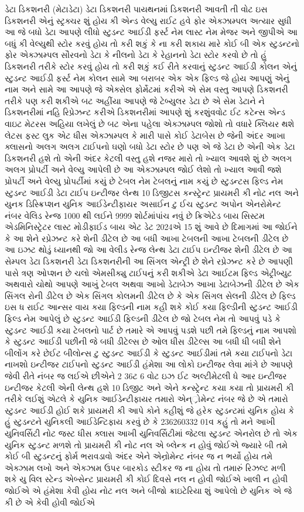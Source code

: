 \documentclass[aspectratio=169, 10pt]{beamer}
\begin{document}
\begin{frame}{ડેટા ડિકશનરી (મેટાડેટા)}
{ડેટા ડિકશનરી પાયથનમાં ડિકશનરી આવતી તી વોટ ઇસ ડિકશનરી એનું સ્ટ્રક્ચર શું હોય કી એન્ડ વેલ્યુ રાઈટ હવે ફોર એક્ઝામ્પલ અત્યાર સુધી આ જે બધો ડેટા આપણે લીધો સ્ટુડન્ટ આઈડી ફર્સ્ટ નેમ લાસ્ટ નેમ મેજર અને જીપીએ આ બધું કી વેલ્યુથી સ્ટોર કરવું હોય તો કરી શકું કે ના કરી શકાય મારે કોઈ બી એક સ્ટુડન્ટનો ફોર એક્ઝામ્પલ સૌરવનો ડેટા કે નીલનો ડેટા કે રેહાનનો ડેટા સ્ટોર કરવો છે તો હું ડિકશનરી તરીકે સ્ટોર કરવું હોય તો કરી શકું કઈ રીતે કરવાનું સ્ટુડન્ટ આઈડી કોલન એનું સ્ટુડન્ટ આઈડી ફર્સ્ટ નેમ કોલન સામે આ બરાબર એક એક ફિલ્ડ જે હોય આપણું એનું નામ અને સામે આ આપણે જે એક્સેલ ફોર્મેટમાં કરીએ એ સેમ વસ્તુ આપણે ડિકશનરી તરીકે પણ કરી શકીએ બટ અહીંયા આપણે જે ટેબ્યુલર ડેટા છે એ સેમ ડેટાને ને ડિકશનરીમાં નહિ રિપ્રેઝન્ટ કરીએ ડિકશનરીમાં આપણે શું કરશુંવવોટ ઈટ કટેન્સ એન્ડ વાઇટ મેટરસ અહિયા લખેલું છે બટ એના પહેલા એક્ઝામ્પલ જોશો તો વધારે ક્લિયર થશે લેટસ ફસ્ટ લુક એટ ધીસ એક્ઝામ્પલ કે મારી પાસે કોઈ ડેટાબેસ છે જેની અંદર આખા ક્લાસનો અલગ અલગ ટાઈપનો ઘણો બધો ડેટા સ્ટોર છે પણ એ જે ડેટા છે એની એક ડેટા ડિકશનરી હશે તો એની અંદર કેટલી વસ્તુ હશે નજર મારો તો ખ્યાલ આવશે શું છે અલગ અલગ પ્રોપર્ટી અને વેલ્યુ આપેલી છે આ એક્ઝામ્પલ જોઈ લેશો તો ખ્યાલ આવી જશે પ્રોપર્ટી અને વેલ્યુ પ્રોપર્ટીમાં કયું છે ટેબલ નેમ ટેબલનું નામ કયું છે સ્ટુડન્ટસ ફિલ્ડ નેમ સ્ટુડન્ટ આઈડી ડેટા ટાઈપ ઇન્ટીજર લેન્થ 10 ડિજીટસ કન્સ્ટ્રેન્ટ પ્રાયમરી કી નોટ નલ અને યુનક ડિસ્ક્રિપ્શન યુનિક આઈડેન્ટીફાયર અસાઈન ટુ ઈચ સ્ટુડન્ટ અપોન એનરોમેન્ટ નંબર વેલિડ રેન્જ 1000 થી લઈને 9999 શોર્ટમાંપાંચ નવું છે ક્રિએટેડ બાય સિસ્ટમ એડમિનિસ્ટ્રેટર લાસ્ટ મોડીફાઈડ બાય એટ ડેટ 2024એ 15 શું આવે છે દિમાગમાં આ જોઈને કે આ શેને રપ્રેઝન્ટ કરે શેની ડીટેલ છે આ બધી આખા ટેબલની આખા ટેબલની ડીટેલ છે આ ઇઝટ થોડું ધ્યાનથી જો આ વેલીડ રેન્જ લેન્થ ડેટા ટાઈપ ઇન્ટીજર શેની ડીટેલ છે આ સેમ્પલ ડેટા ડિકશનરી ડેટા ડિકશનરીની આ સિંગલ એન્ટ્રી છે શેને રપ્રેઝન્ટ કરે છે આપણી પાસે ત્રણ ઓપ્શન છે ચલો એમસીક્યુ ટાઈપનું કરી શકીએ ડેટા આઈટમ ફિલ્ડ એટ્રીબ્યુટ અથવારો ચોથો આપણે આખું ટેબલ અથવા આખો ડેટાબેઝ આખા ડેટાબેઝની ડીટેલ છે એક સિંગલ રોની ડીટેલ છે એક સિંગલ કોલમની ડીટેલ છે કે એક સિંગલ સેલની ડીટેલ છે ફિલ્ડ ઇસ ધ રાઈટ આન્સર વાય કયા ફિલ્ડની નામ કહી શકે કોઈ કયા ફિલ્ડીની સ્ટુડન્ટ આઈડી ફિલ્ડ નેમ આપેલું છે સ્ટુડન્ટ આઈડી ફિલ્ડની ડીટેલ છે જો ટેબલ નેમ તો આપવું પડે કે સ્ટુડન્ટ આઈડી કયા ટેબલનો પાર્ટ છે તમારે એ આપવું પડશે પછી તમે ફિલ્ડનું નામ આપશો કે સ્ટુડન્ટ આઈડી પછીની જે બધી ડીટેલ્સ છે ઓલ ધીસ ડીટેલ્સ આ બધી ધી બધી શેને બીલોંગ કરે છેઈટ બીલોન્સ ટુ સ્ટુડન્ટ આઈડી કે સ્ટુડન્ટ આઈડીમાં તમે કયા ટાઈપનો ડેટા નાખશો ઇન્ટીજર ટાઈપનો સ્ટુડન્ટ આઈડી હંમેશા આ લોકો ઇન્ટીજર લેવા માંગે છે આપણે જેવી રીતે નંબર જ લઈએ છીએને 2 36ટ 6 વોટ ઇઝ ઈટ અલ્ટીમેટલી ધે આર ઇન્ટીજર ઇન્ટીજર કેટલી એની લેન્થ હશે 10 ડિજીટ અને એને કન્સ્ટ્રેન્ટ કયા કયા તો પ્રાયમરી કી તરીકે લઈશું એટલે કે યુનિક આઈડેન્ટીફાયર તમારો એન્્રોમેન્ટ નંબર જે છે એ તમારો સ્ટુડન્ટ આઈડી હોઈ શકે પ્રાયમરી કી આપે કોને કહીશું જે હરેક સ્ટુડન્ટમાં યુનિક હોય કે હું સ્ટુડન્ટને યુનિકલી આઈડેન્ટિફાય કરવું છે કે 236260332 01વ કહું તો મને આખી યુનિવર્સિટી નોટ જસ્ટ ધીસ ક્લાસ આખી યુનિવર્સિટીમાં જેટલા સ્ટુડન્ટ એનરોલ છે તો એક યુનિક સ્ટુડન્ટ મળશે તો પ્રાયમરી કી નોટ નલ એ બ્લેન્ક ન હોવું જોઈએ જ્યારે બી તમે કોઈ બી સ્ટુડન્ટનું ફોર્મ ભરાવડાવો અંદર એને એન્રોમેન્ટ નંબર જ ન ભર્યો હોય તમે એક્ઝામ લખો અને એક્ઝામ ઉપર બારકોડ સ્ટીકર જ ના હોય તો તમારું રિઝલ્ટ મળી શકે યુ વિલ સ્ટેન્ડ એબ્સેન્ટ પ્રાયમરી કી કોઈ દિવસે નલ ન હોવી જોઈએ ખાલી ન હોવી જોઈએ એ હંમેશા કેવી હોય નોટ નલ અને બીજો ક્રાઇટેરિયા શું આપેલો છે યુનિક એ જે કી છે એ કેવી હોવી જોઈએ }
\end{frame}
\end{document}
